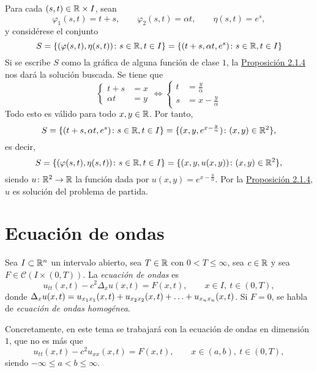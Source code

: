\documentclass[a4paper, 12pt, extrafontsizes]{memoir}
\begin{document}
\begin{example}
\begin{itemize}
    \end{itemize}
    Para cada $(s,t) \in \mathbb R \times I$, sean
    \[\varphi_1(s,t) = t+s, \qquad \varphi_2(s,t) = \alpha t, \qquad \eta(s,t) = e^s,\]
    y considérese el conjunto
    \[S =  \left\{(\varphi(s,t),\eta(s,t)) \colon s \in \mathbb R, t \in I\right\} = \{(t+s,\alpha t, e^s) \colon s \in \mathbb R, t \in I\}\]
    Si se escribe $S$ como la gráfica de alguna función de clase $1$, la \hyperref[pro:2.1.4]{\color{gray}Proposición 2.1.4} nos dará la solución buscada. Se tiene que
    \[
        \left\{\begin{alignedat}{2}
            t+s &= x \\
            \alpha t &= y
        \end{alignedat}\right. \iff \left\{\begin{alignedat}{2}
            t &= \frac{y}{\alpha} \\
            s &= x-\frac{y}{\alpha}
        \end{alignedat}\right.
    \]
    Todo esto es válido para todo $x,y \in \mathbb R$. Por tanto,
    \[S =  \{(t+s,\alpha t, e^s) \colon s \in \mathbb R, t \in I\} = \{(x,y,e^{x-\frac{y}{\alpha}}) \colon (x,y) \in \mathbb R^2 \},\]
    es decir,
    \[S =  \left\{(\varphi(s,t),\eta(s,t)) \colon s \in \mathbb R, t \in I\right\} = \{(x,y,u(x,y)) \colon (x,y) \in \mathbb R^2 \},\]
    siendo $u \colon \mathbb R^2 \to \mathbb R$ la función dada por $u(x,y) = e^{x-\frac{y}{\alpha}}$. Por la \hyperref[pro:2.1.4]{\color{gray}Proposición 2.1.4}, $u$ es solución del problema de partida.
\end{example}

\chapter{Ecuación de ondas}

\begin{definition}
    Sea $I \subset \mathbb R^n$ un intervalo abierto, sea $T \in \mathbb R$ con $0 < T \leq \infty$, sea $c \in \mathbb R$ y sea $F \in \mathcal{C}(I \times (0,T))$. La \emph{ecuación de ondas} es
    \[u_{tt}(x,t) - c^2\Delta_xu(x,t) = F(x,t), \qquad x \in I, \ t \in (0,T),\]
    donde $\Delta_xu(x,t) = u_{x_1x_1}(x,t)+u_{x_2x_2}(x,t)+\mathellipsis+u_{x_nx_n}(x,t)$. Si $F = 0$, se habla de \emph{ecuación de ondas homogénea}.
\end{definition}

Concretamente, en este tema se trabajará con la ecuación de ondas en dimensión $1$, que no es más que
\[u_{tt}(x,t) - c^2u_{xx}(x,t) = F(x,t), \qquad x \in (a,b), \ t \in (0,T),\]
siendo $-\infty \leq a < b \leq \infty$.
\end{document}
